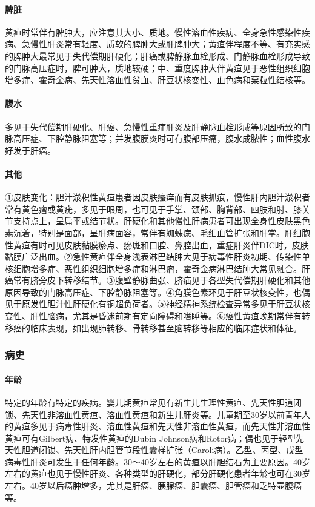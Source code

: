 \paragraph{脾脏}

黄疸时常伴有脾肿大，应注意其大小、质地。慢性溶血性疾病、全身急性感染性疾病、急慢性肝炎常有轻度、质软的脾肿大或肝脾肿大；黄疸伴程度不等、有充实感的脾肿大最常见于失代偿期肝硬化；肝癌或脾静脉血栓形成、门静脉血栓形成导致的门脉高压症时，脾可肿大，质地较硬；中、重度脾肿大伴黄疸见于恶性组织细胞增多症、霍奇金病、先天性溶血性贫血、肝豆状核变性、血色病和粟粒性结核等。

\paragraph{腹水}

多见于失代偿期肝硬化、肝癌、急慢性重症肝炎及肝静脉血栓形成等原因所致的门脉高压症、下腔静脉阻塞等；并发腹膜炎时可有腹部压痛，腹水成脓性；血性腹水好发于肝癌。

\paragraph{其他}

①皮肤变化：胆汁淤积性黄疸患者因皮肤瘙痒而有皮肤抓痕，慢性肝内胆汁淤积者常有黄色瘤或黄疣，多见于眼周，也可见于手掌、颈部、胸背部、四肢和肘、膝关节支持点上，呈扁平或结节状。肝硬化和其他慢性肝病患者可出现全身性皮肤黑色素沉着，特别是面部，呈肝病面容，常伴有蜘蛛痣、毛细血管扩张和肝掌。肝细胞性黄疸有时可见皮肤黏膜瘀点、瘀斑和口腔、鼻腔出血，重症肝炎伴DIC时，皮肤黏膜广泛出血。②急性黄疸伴全身浅表淋巴结肿大见于病毒性肝炎初期、传染性单核细胞增多症、恶性组织细胞增多症和淋巴瘤，霍奇金病淋巴结肿大常见融合。肝癌常有脐旁皮下转移结节。③腹壁静脉曲张、脐疝见于各型失代偿期肝硬化和其他原因导致的门脉高压症、下腔静脉阻塞等。④角膜色素环见于肝豆状核变性，也偶见于原发性胆汁性肝硬化有铜超负荷者。⑤神经精神系统检查异常多见于肝豆状核变性、肝性脑病，尤其是昏迷前期有定向障碍和嗜睡等。⑥癌性黄疸晚期常伴有转移癌的临床表现，如出现肺转移、骨转移甚至脑转移等相应的临床症状和体征。

\subsubsection{病史}

\paragraph{年龄}

特定的年龄有特定的疾病。婴儿期黄疸常见有新生儿生理性黄疸、先天性胆道闭锁、先天性非溶血性黄疸、溶血性黄疸和新生儿肝炎等。儿童期至30岁以前青年人的黄疸多见于病毒性肝炎、溶血性黄疸和先天性非溶血性黄疸，而先天性非溶血性黄疸可有Gilbert病、特发性黄疸的Dubin
Johnson病和Rotor病；偶也见于轻型先天性胆道闭锁、先天性肝内胆管节段性囊样扩张（Caroli病）。乙型、丙型、戊型病毒性肝炎可发生于任何年龄。30～40岁左右的黄疸以肝胆结石为主要原因。40岁左右的黄疸也见于慢性肝炎、各种类型的肝硬化，部分肝硬化患者年龄也可在30岁左右。40岁以后癌肿增多，尤其是肝癌、胰腺癌、胆囊癌、胆管癌和乏特壶腹癌等。

